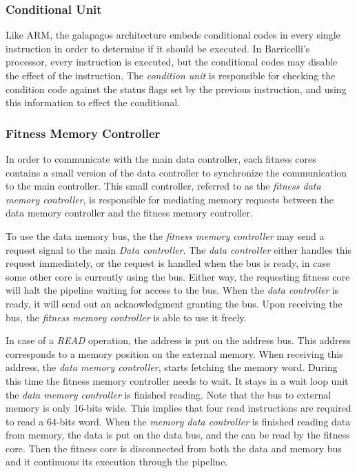 \newpage
\subsubsection{Conditional Unit}
Like ARM, the \Gls{galapagos} architecture embeds conditional codes in every single instruction in order to determine if it should be executed.
In Barricelli's processor, every instruction is executed, but the conditional codes may disable the effect of the instruction.
The \emph{condition unit} is responsible for checking the condition code against the status flags set by the previous instruction, and using this information to effect the conditional.

\newpage
\subsubsection{Fitness Memory Controller} 
In order to communicate with the main data controller, each fitness cores contains a small version of the data controller to synchronize the communication to the main controller.
This small controller, referred to as the \emph{fitness data memory controller}, is responsible for mediating memory requests between the data memory controller and the fitness memory controller.

To use the data memory bus, the the \emph{fitness memory controller} may send a request signal to the main \emph{Data controller}. 
The \emph{data controller} either handles this request immediately, or the request is handled when the bus is ready, in case some other core is currently using the bus.
Either way, the requesting fitness core will halt the pipeline waiting for access to the bus.
When the \emph{data controller} is ready, it will send out an acknowledgment granting the bus.
Upon receiving the bus, the \emph{fitness memory controller} is able to use it freely. 

In case of a \emph{READ} operation, the address is put on the address bus. This address corresponds to a memory position on the external memory. When receiving this address, the \emph{data memory controller}, starts fetching the memory word. During this time the fitness memory controller needs to wait. It stays in a wait loop unit the \emph{data memory controller} is finished reading. Note that the bus to external memory is only 16-bits wide. This implies that four read instructions are required to read a 64-bits word. When the \emph{memory data controller} is finished reading data from memory, the data is put on the data bus, and the can be read by the fitness core. Then the fitness core is disconnected from both the data and memory bus and it continuous its execution through the pipeline.


